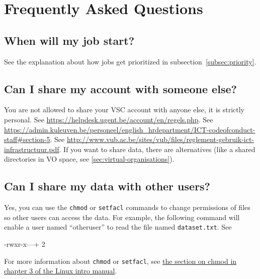 \chapter{Frequently Asked Questions}
\label{ch:faq}

\ifgent
\section{When will my job start?}

See the explanation about how jobs get prioritized in subsection~\ref{subsec:priority}.

\fi
\section{Can I share my account with someone else?}

 You are not allowed to share your VSC account with anyone else, it is strictly personal.
\ifgent
See \url{https://helpdesk.ugent.be/account/en/regels.php}.
\fi
\ifleuven
See \url{https://admin.kuleuven.be/personeel/english_hrdepartment/ICT-codeofconduct-staff#section-5}.
\fi
\ifbrussel
See \url{http://www.vub.ac.be/sites/vub/files/reglement-gebruik-ict-infrastructuur.pdf}.
\fi
\ifgent
If you want to share data, there are alternatives (like a shared
directories in VO space, see \autoref{sec:virtual-organisations}).
\fi

\section{Can I share my data with other \hpc users?}

Yes, you can use the \verb|chmod| or \verb|setfacl| commands to change permissions
of files so other users can access the data. For example, the following command
will enable a user named ``otheruser'' to read the file named \verb|dataset.txt|.
See

\begin{prompt}
-rwxr-x---+ 2 %
\end{prompt}

For more information about \verb|chmod| or \verb|setfacl|, see \href{\LinuxManualURL#sec:chmod}
{the section on chmod in chapter 3 of the Linux intro manual}.
